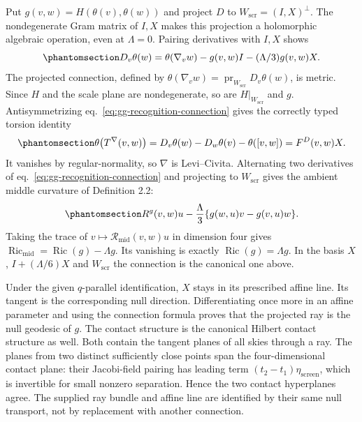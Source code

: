 \documentclass[
  english,
  11pt,
  reqno]{amsart}
\begin{document}
Put \(g(v,w)=H(\theta(v),\theta(w))\) and project \(D\) to
\(W_{\mathrm{scr}}=(I,X)^\perp\). The nondegenerate Gram matrix of
\(I,X\) makes this projection a holomorphic algebraic operation, even at
\(\Lambda=0\). Pairing derivatives with \(I,X\) shows
\begin{equation}\protect\phantomsection\label{eq:gg-recognition-connection}{
 D_v\theta(w)
  =\theta(\nabla_vw)-g(v,w)I
                         -(\Lambda/3)g(v,w)X.
}\end{equation} The projected connection, defined by
\(\theta(\nabla_vw)=\operatorname{pr}_{W_{\mathrm{scr}}}D_v\theta(w)\),
is metric. Since \(H\) and the scale plane are nondegenerate, so are
\(H|_{W_{\mathrm{scr}}}\) and \(g\). Antisymmetrizing
eq.~\ref{eq:gg-recognition-connection} gives the correctly typed torsion
identity
\begin{equation}\protect\phantomsection\label{eq:gg-recognition-torsion-type}{
 \theta\bigl(T^\nabla(v,w)\bigr)
 =D_v\theta(w)-D_w\theta(v)-\theta([v,w])
 =F^D(v,w)X.
}\end{equation} It vanishes by regular-normality, so \(\nabla\) is
Levi--Civita. Alternating two derivatives of
eq.~\ref{eq:gg-recognition-connection} and projecting to
\(W_{\mathrm{scr}}\) gives the ambient middle curvature of Definition
2.2:
\begin{equation}\protect\phantomsection\label{eq:gg-recognition-curvature}{
 R^g(v,w)u-\frac{\Lambda}{3}
                 \{g(w,u)v-g(v,u)w\}.
}\end{equation} Taking the trace of
\(v\mapsto\mathcal R_{\mathrm{mid}}(v,w)u\) in dimension four gives
\(\operatorname{Ric}_{\mathrm{mid}}=\operatorname{Ric}(g)-\Lambda g\).
Its vanishing is exactly \(\operatorname{Ric}(g)=\Lambda g\). In the
basis \(X\), \(I+(\Lambda/6)X\) and \(W_{\mathrm{scr}}\) the connection
is the canonical one above.

Under the given \(q\)-parallel identification, \(X\) stays in its
prescribed affine line. Its tangent is the corresponding null direction.
Differentiating once more in an affine parameter and using the
connection formula proves that the projected ray is the null geodesic of
\(g\). The contact structure is the canonical Hilbert contact structure
as well. Both contain the tangent planes of all skies through a ray. The
planes from two distinct sufficiently close points span the
four-dimensional contact plane: their Jacobi-field pairing has leading
term \((t_2-t_1)\eta_{\mathrm{screen}}\), which is invertible for small
nonzero separation. Hence the two contact hyperplanes agree. The
supplied ray bundle and affine line are identified by their same null
transport, not by replacement with another connection.
\end{document}
